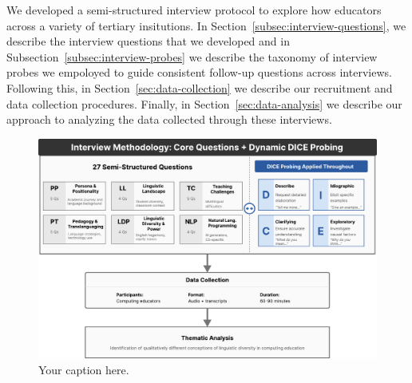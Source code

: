 We developed a semi-structured interview protocol to explore how educators
across a variety of tertiary insitutions. In
Section~\ref{subsec:interview-questions}, we describe the interview questions
that we developed and in Subsection~\ref{subsec:interview-probes} we describe
the taxonomy of interview probes we empoloyed to guide consistent follow-up
questions across interviews. Following this, in
Section~\ref{sec:data-collection} we describe our recruitment and data
collection procedures. Finally, in Section~\ref{sec:data-analysis} we describe
our approach to analyzing the data collected through these interviews.

\begin{figure}[ht]
  \centering
  \includegraphics[width=\textwidth]{imgs/methods.pdf}
  \caption{Your caption here.}
  \label{fig:methods}
\end{figure}


